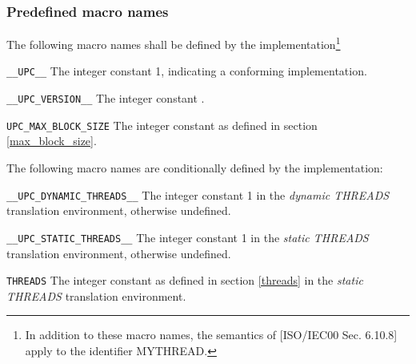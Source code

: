 \subsubsection{Predefined macro names}

\npf The following macro names shall be defined by the
    implementation\footnote{In addition to these macro names,
    the semantics of [ISO/IEC00 Sec. 6.10.8] apply to the identifier MYTHREAD.}

\begin{description}
\item{\tt \_\_UPC\_\_} 
The integer constant 1, indicating a conforming implementation.

\item{\tt \_\_UPC\_VERSION\_\_}
The integer constant 
.

\item{\tt UPC\_MAX\_BLOCK\_SIZE}
The integer constant as defined in section \ref{max_block_size}.
\end{description}

\np The following macro names are conditionally defined 
    by the implementation:

\begin{description}
\item{\tt \_\_UPC\_DYNAMIC\_THREADS\_\_} 
The integer constant 1 in the {\em dynamic THREADS} translation environment,
otherwise undefined.

\item{\tt \_\_UPC\_STATIC\_THREADS\_\_} 
The integer constant 1 in the {\em static THREADS} translation environment,
otherwise undefined.

\item{\tt THREADS}
The integer constant as defined in section \ref{threads} in the
{\em static THREADS} translation environment.

\end{description}

